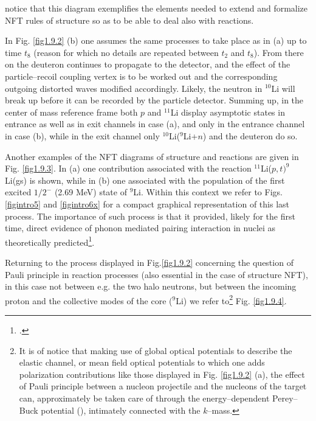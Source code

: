 notice that this diagram exemplifies  the elements needed to extend and formalize NFT rules of
structure so as to be able to deal also with reactions.


 In Fig. \ref{fig1.9.2} (b) one assumes the same processes to take place  as in (a) up to time $t_8$ (reason for which no details
are repeated between $t_2$ and $t_8$). From there on the deuteron continues to propagate to
the detector, and the effect of the particle--recoil coupling vertex is to be worked out and the corresponding outgoing distorted waves modified accordingly. Likely, the neutron in $^{10}$Li will break up
before it can be recorded by the particle detector. Summing up, in the center of mass reference frame both $p$ and $^{11}$Li
display asymptotic states in entrance as well as in exit channels in case (a), and only
in the entrance channel in case (b), while in the exit channel only $^{10}$Li($^9$Li+$n$) and the
deuteron do so. 

Another examples of the NFT diagrams of structure and reactions are given in Fig. \ref{fig1.9.3}. In (a) one contribution associated with the reaction $^{11}$Li($p,t)^9$Li(gs) is shown, while in (b) one associated with the population of the first excited $1/2^-$ (2.69 MeV) state of $^9$Li. Within this context we refer to Figs. \ref{figintro5} and \ref{figintro6x}   for a compact graphical representation of this last process. The importance of such process is that it provided, likely for the first time, direct evidence of phonon mediated pairing interaction in nuclei as theoretically predicted\footnote{\cite{Barranco:01} \cite{Tanihata:08,Potel:10,Tanihata:13,Beceiro:15}.}.

          Returning to the process displayed in Fig.\ref{fig1.9.2} concerning the question of Pauli principle in reaction processes (also essential in the case of structure NFT), in this case
          not between e.g. the two halo neutrons, but between the incoming proton and the collective modes
          of the core ($^9$Li) we refer to\footnote{It is of notice that making use of global optical potentials to
                    describe the elastic channel, or mean field optical potentials to which one adds polarization contributions
                    like those displayed in Fig. \ref{fig1.9.2} (a), the effect of Pauli principle between a nucleon projectile and the
                    nucleons of the target can,  approximately be taken care of through the energy--dependent Perey--Buck
                    potential (\cite{Perey:62}), intimately connected with the $k$--mass.} Fig. \ref{fig1.9.4}. 
          
